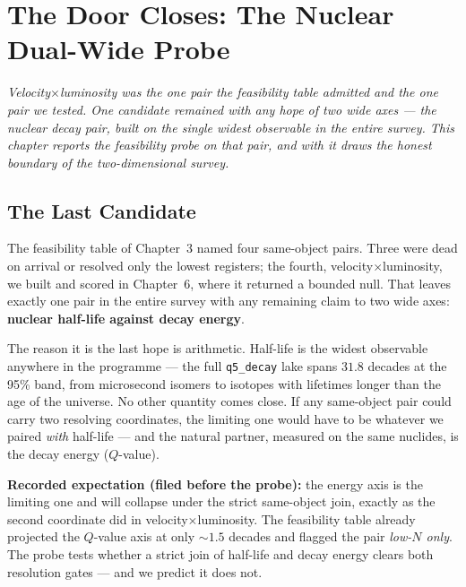 \documentclass[11pt, letterpaper, openany]{book}
\begin{document}
\chapter{The Door Closes: The Nuclear Dual-Wide Probe}

\begin{center}
\textit{Velocity$\times$luminosity was the one pair the feasibility table admitted and the one pair
we tested. One candidate remained with any hope of two wide axes --- the nuclear decay pair, built
on the single widest observable in the entire survey. This chapter reports the feasibility probe on
that pair, and with it draws the honest boundary of the two-dimensional survey.}
\end{center}

\section{The Last Candidate}

The feasibility table of Chapter~3 named four same-object pairs. Three were dead on arrival or
resolved only the lowest registers; the fourth, velocity$\times$luminosity, we built and scored in
Chapter~6, where it returned a bounded null. That leaves exactly one pair in the entire survey with
any remaining claim to two wide axes: \textbf{nuclear half-life against decay energy}.

The reason it is the last hope is arithmetic. Half-life is the widest observable anywhere in the
programme --- the full \texttt{q5\_decay} lake spans $31.8$ decades at the 95\% band, from
microsecond isomers to isotopes with lifetimes longer than the age of the universe. No other
quantity comes close. If any same-object pair could carry two resolving coordinates, the limiting
one would have to be whatever we paired \emph{with} half-life --- and the natural partner, measured
on the same nuclides, is the decay energy ($Q$-value).

\begin{predictionbox}
\textbf{Recorded expectation (filed before the probe):} the energy axis is the limiting one and
will collapse under the strict same-object join, exactly as the second coordinate did in
velocity$\times$luminosity. The feasibility table already projected the $Q$-value axis at only
$\sim 1.5$ decades and flagged the pair \emph{low-$N$ only}. The probe tests whether a strict join
of half-life and decay energy clears both resolution gates --- and we predict it does not.
\end{predictionbox}
\end{document}

